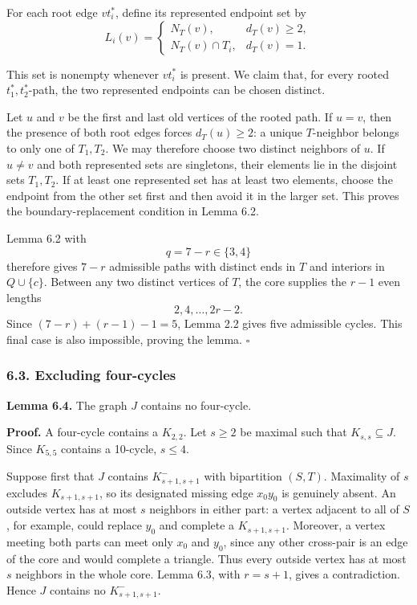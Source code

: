 \documentclass[
  11pt]{article}
\let\papersubsection\subsubsection
\renewcommand{\subsubsection}{\Needspace{7\baselineskip}\papersubsection}
\begin{document}
For each root edge \(vt_i^*\), define its represented endpoint set by \[
 L_i(v)=
 \begin{cases}
 N_T(v),&d_T(v)\ge2,\\[2mm]
 N_T(v)\cap T_i,&d_T(v)=1.
 \end{cases}
\] 

This set is nonempty whenever \(vt_i^*\) is present. We claim that, for
every rooted \(t_1^*,t_2^*\)-path, the two represented endpoints can be
chosen distinct.

Let \(u\) and \(v\) be the first and last old vertices of the rooted
path. If \(u=v\), then the presence of both root edges forces
\(d_T(u)\ge2\): a unique \(T\)-neighbor belongs to only one of
\(T_1,T_2\). We may therefore choose two distinct neighbors of \(u\). If
\(u\ne v\) and both represented sets are singletons, their elements lie
in the disjoint sets \(T_1,T_2\). If at least one represented set has at
least two elements, choose the endpoint from the other set first and
then avoid it in the larger set. This proves the boundary-replacement
condition in Lemma 6.2.


Lemma 6.2 with \[
 q=7-r\in\{3,4\}
\] therefore gives \(7-r\) admissible paths with distinct ends in \(T\)
and interiors in \(Q\cup\{c\}\). Between any two distinct vertices of
\(T\), the core supplies the \(r-1\) even lengths \[
 2,4,\ldots,2r-2.
\] Since \((7-r)+(r-1)-1=5\), Lemma 2.2 gives five admissible cycles.
This final case is also impossible, proving the lemma. \(\square\)

\subsubsection{6.3. Excluding four-cycles}\label{excluding-four-cycles}

\textbf{Lemma 6.4.} The graph \(J\) contains no four-cycle.

\textbf{Proof.} A four-cycle contains a \(K_{2,2}\). Let \(s\ge2\) be
maximal such that \(K_{s,s}\subseteq J\). Since \(K_{5,5}\) contains a
10-cycle, \(s\le4\).

Suppose first that \(J\) contains \(K_{s+1,s+1}^-\) with bipartition
\((S,T)\). Maximality of \(s\) excludes \(K_{s+1,s+1}\), so its
designated missing edge \(x_0y_0\) is genuinely absent. An outside
vertex has at most \(s\) neighbors in either part: a vertex adjacent to
all of \(S\), for example, could replace \(y_0\) and complete a
\(K_{s+1,s+1}\). Moreover, a vertex meeting both parts can meet only
\(x_0\) and \(y_0\), since any other cross-pair is an edge of the core
and would complete a triangle. Thus every outside vertex has at most
\(s\) neighbors in the whole core. Lemma 6.3, with \(r=s+1\), gives a
contradiction. Hence \(J\) contains no \(K_{s+1,s+1}^-\).
\end{document}
